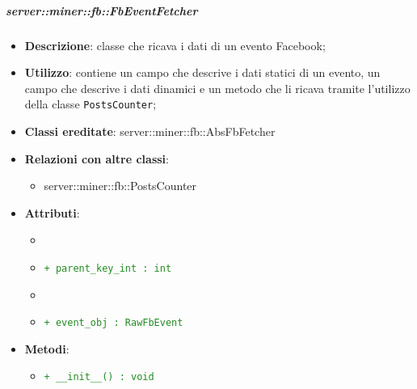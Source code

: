 		\subparagraph{server::miner::fb::FbEventFetcher} %
		\label{subp:server_miner_fb_FbEventFetcher}
			\begin{itemize}
				\item \textbf{Descrizione}: classe che ricava i dati di un evento Facebook;
				\item \textbf{Utilizzo}: contiene un campo che descrive i dati statici di un evento, un campo che descrive i dati dinamici e un metodo che li ricava tramite l'utilizzo della classe \texttt{PostsCounter};
				\item \textbf{Classi ereditate}: server::miner::fb::AbsFbFetcher
				\item \textbf{Relazioni con altre classi}:
					\begin{itemize}
						\item server::miner::fb::PostsCounter
					\end{itemize}
				\item \textbf{Attributi}: 
					\begin{itemize}
						\item \item \textcolor{forestgreen}{\texttt{+ parent\_key\_int : int}}
						\item \item \textcolor{forestgreen}{\texttt{+ event\_obj : RawFbEvent}}
					\end{itemize}
				\item \textbf{Metodi}:   
					\begin{itemize}
						\item \textcolor{forestgreen}{\texttt{+ \_\_init\_\_() : void}}
\end{itemize}
\end{itemize}
